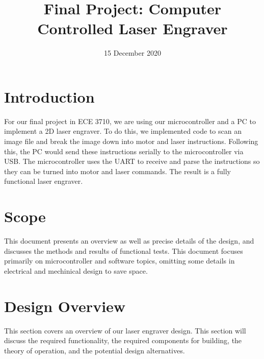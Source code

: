 \documentclass[11pt]{LaTeX-Classes/math-hw}
\title{Final Project: Computer Controlled Laser Engraver}
\date{15 December 2020}
\begin{document}
\maketitle

\section{Introduction}
For our final project in ECE 3710, we are using our microcontroller and a PC to implement a 2D laser engraver. To do this, we implemented code to scan an image file and break the image down into motor and laser instructions. Following this, the PC would send these instructions serially to the microcontroller via USB. The microcontroller uses the UART to receive and parse the instructions so they can be turned into motor and laser commands. The result is a fully functional laser engraver.

\section{Scope}
This document presents an overview as well as precise details of the design,
and discusses the methods and results of functional tests.
This document focuses primarily on microcontroller and software topics,
omitting some details in electrical and mechinical design to save space.

\section{Design Overview}
This section covers an overview of our laser engraver design. This section will discuss the required functionality, the required components for building, the theory of operation, and the potential design alternatives. 
\end{document}
